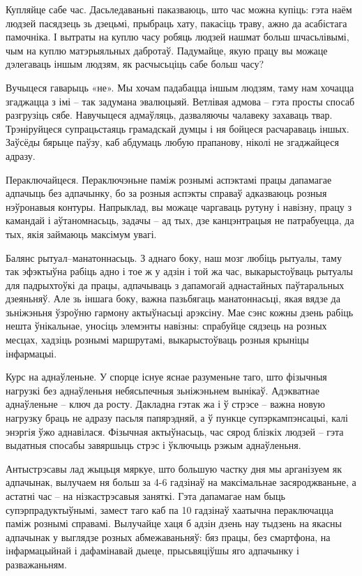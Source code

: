 Купляйце сабе час. Дасьледаваньні паказваюць, што час можна купіць: гэта наём людзей пасядзець зь дзецьмі, прыбраць хату, пакасіць траву, ажно да асабістага памочніка. І вытраты на куплю часу робяць людзей нашмат больш шчасьлівымі, чым на куплю матэрыяльных дабротаў. Падумайце, якую працу вы можаце дэлегаваць іншым людзям, як расчысьціць сабе больш часу?

Вучыцеся гаварыць «не». Мы хочам падабацца іншым людзям, таму нам хочацца згаджацца з імі – так задумана эвалюцыяй. Ветлівая адмова – гэта просты спосаб разгрузіць сябе. Навучыцеся адмаўляць, дазваляючы чалавеку захаваць твар. Трэніруйцеся супрацьстаяць грамадскай думцы і ня бойцеся расчараваць іншых. Заўсёды бярыце паўзу, каб абдумаць любую прапанову, ніколі не згаджайцеся адразу.

Пераключайцеся. Пераключэньне паміж рознымі аспэктамі працы дапамагае адпачыць без адпачынку, бо за розныя аспэкты справаў адказваюць розныя нэўронавыя контуры. Напрыклад, вы можаце чаргаваць рутуну і навізну, працу з камандай і аўтаномнасьць, задачы – ад тых, дзе канцэнтрацыя не патрабуецца, да тых, якія займаюць максімум увагі.

Балянс рытуал--манатоннасьць. З аднаго боку, наш мозг любіць рытуалы, таму так эфэктыўна рабіць адно і тое ж у адзін і той жа час, выкарыстоўваць рытуалы для падрыхтоўкі да працы, адпачываць з дапамогай аднастайных паўтаральных дзеяньняў. Але зь іншага боку, важна пазьбягаць манатоннасьці, якая вядзе да зьніжэньня ўзроўню гармону актыўнасьці арэксіну. Мае сэнс кожны дзень рабіць нешта ўнікальнае, уносіць элемэнты навізны: спрабуйце сядзець на розных месцах, хадзіць рознымі маршрутамі, выкарыстоўваць розныя крыніцы інфармацыі.

Курс на аднаўленьне. У спорце існуе яснае разуменьне таго, што фізычныя нагрузкі без аднаўленьня небясьпечныя зьніжэньнем вынікаў. Адэкватнае аднаўленьне – ключ да росту. Дакладна гэтак жа і ў стрэсе – важна новую нагрузку браць не адразу пасьля папярэдняй, а ў пункце супэркампэнсацыі, калі энэргія ўжо аднавілася. Фізычная актыўнасьць, час сярод блізкіх людзей – гэта выдатныя спосабы завяршыць стрэс і ўключыць рэжым аднаўленьня.

Антыстрэсавы лад жыцьця мяркуе, што большую частку дня мы арганізуем як адпачынак, вылучаем ня больш за 4-6 гадзінаў на максімальнае засяроджваньне, а астатні час – на нізкастрэсавыя заняткі. Гэта дапамагае нам быць супэрпрадуктыўнымі, замест таго каб па 10 гадзінаў хаатычна пераключацца паміж рознымі справамі. Вылучайце хаця б адзін дзень нау тыдзень на якасны адпачынак у выглядзе розных абмежаваньняў: бяз працы, без смартфона, на інфармацыйнай і дафамінавай дыеце, прысьвяціўшы яго адпачынку і разважаньням.

